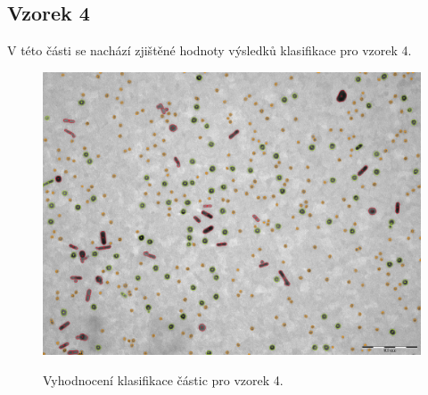 \documentclass[11pt,twoside,a4paper,table]{book}
\begin{document}
\newpage
\FloatBarrier
\subsection{Vzorek 4}
V této části se nachází zjištěné hodnoty výsledků klasifikace pro vzorek 4.

\begin{figure}[hb]
\center
\includegraphics[width=\textwidth]{figures/multi6_klasifikace.png}
\label{fig:class4}
\caption{Vyhodnocení klasifikace částic pro vzorek 4.}
\end{figure}
\end{document}

